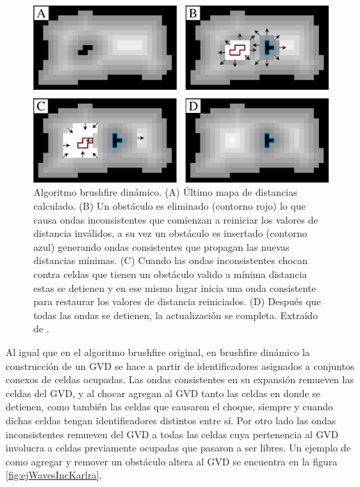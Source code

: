 \begin{figure}[H]
  \center
  \includegraphics[width=1\linewidth]{imagenes/wavesBrushDinClean2Rows.png}
  \caption[Algoritmo brushfire dinámico.]{Algoritmo brushfire dinámico. (A) Último mapa de distancias calculado. (B) Un obstáculo es eliminado (contorno rojo) lo que causa ondas inconsistentes que comienzan a reiniciar los valores de distancia inválidos, a su vez un obstáculo es insertado (contorno azul) generando ondas consistentes que propagan las nuevas distancias mínimas. (C) Cuando las ondas inconsistentes chocan contra celdas que tienen un obstáculo valido a mínima distancia estas se detienen y en ese mismo lugar inicia una onda consistente para restaurar los valores de distancia reiniciados. (D) Después que todas las ondas se detienen, la actualización se completa. Extraído de \cite{Lau2013}.}\label{fig:wavesBrushDyn}
\end{figure} 

Al igual que en el algoritmo brushfire original, en brushfire dinámico la
construcción de un GVD se hace a partir de identificadores asignados a
conjuntos conexos de celdas ocupadas.
Las ondas consistentes en su expansión remueven las celdas del GVD, y al
chocar agregan al GVD tanto las celdas en donde se detienen, como también
las celdas que causaron el choque, siempre y cuando dichas celdas tengan
identificadores distintos entre sí. Por otro lado las ondas inconsistentes remueven del
GVD a todas las celdas cuya pertenencia al GVD involucra a celdas previamente
ocupadas que pasaron a ser libres. Un ejemplo de como agregar y remover un
obstáculo altera al GVD se encuentra en la figura \ref{fig:ejWavesIncKarlra}. 

